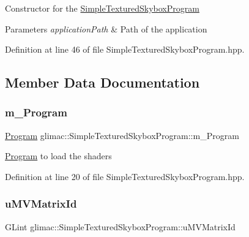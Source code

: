 Constructor for the \hyperlink{classglimac_1_1_simple_textured_skybox_program}{Simple\+Textured\+Skybox\+Program} 
\begin{DoxyParams}{Parameters}
{\em application\+Path} & Path of the application \\
\hline
\end{DoxyParams}


Definition at line 46 of file Simple\+Textured\+Skybox\+Program.\+hpp.



\subsection{Member Data Documentation}
\mbox{\label{classglimac_1_1_simple_textured_skybox_program_a0572a57424eae571f9a56067629c7396}} 
\subsubsection{\texorpdfstring{m\+\_\+\+Program}{m\_Program}}
{\footnotesize\ttfamily \hyperlink{classglimac_1_1_program}{Program} glimac\+::\+Simple\+Textured\+Skybox\+Program\+::m\+\_\+\+Program}

\hyperlink{classglimac_1_1_program}{Program} to load the shaders 

Definition at line 20 of file Simple\+Textured\+Skybox\+Program.\+hpp.

\mbox{\label{classglimac_1_1_simple_textured_skybox_program_a89e896ecf8de0b1b0c4a90f9e257e02c}} 
\subsubsection{\texorpdfstring{u\+M\+V\+Matrix\+Id}{uMVMatrixId}}
{\footnotesize\ttfamily G\+Lint glimac\+::\+Simple\+Textured\+Skybox\+Program\+::u\+M\+V\+Matrix\+Id}

